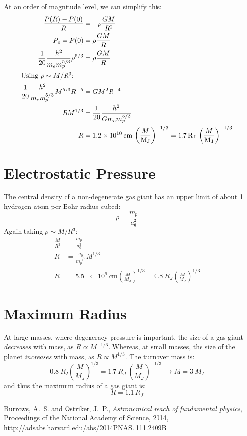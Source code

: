 \documentclass{article}
\begin{document}
    At an order of magnitude level, we can simplify this:
    \begin{align}
      \frac{P(R)-P(0)}{R} &= -\rho\frac{GM}{R^{2}}\\
      P_{e} = P(0) &= \rho\frac{GM}{R}\\
      \frac{1}{20}\frac{h^{2}}{m_{e}m_{p}^{5/3}}\rho^{5/3} &= \rho\frac{GM}{R}\\
      \intertext{Using $\rho\sim M/R^{3}$:}
      \frac{1}{20}\frac{h^{2}}{m_{e}m_{p}^{5/3}}M^{5/3}R^{-5} &= GM^{2}R^{-4}\\
      RM^{1/3} &= \frac{1}{20}\frac{h^{2}}{Gm_{e}m_{p}^{5/3}}\\
      R &= \SI{1.2e10}{\cm}\:\left(\frac{M}{\si{M_{J}}}\right)^{-1/3} = \SI{1.7}{R_{J}}\:\left(\frac{M}{\si{M_{J}}}\right)^{-1/3}
    \end{align}
  
  \section{Electrostatic Pressure}
    The central density of a non-degenerate gas giant has an upper limit of about 1 hydrogen atom per Bohr radius cubed:
    \begin{equation}
      \rho = \frac{m_{p}}{a_{0}^{3}}
    \end{equation}
    Again taking $\rho\sim M/R^{3}$:
    \begin{align}
      \frac{M}{R^{3}} &= \frac{m_{p}}{a_{0}^{3}}\\
      R &= \frac{a_{0}}{m_{p}^{1/3}}M^{1/3}\\
      R &= \SI{5.5e9}{\cm}\left(\frac{M}{\si{M_{J}}}\right)^{1/3} = \SI{0.8}{R_{J}}\left(\frac{M}{\si{M_{J}}}\right)^{1/3}
    \end{align}
    
  \section{Maximum Radius}
    At large masses, where degeneracy pressure is important, the size of a gas giant \emph{decreases} with mass, as $R\propto M^{-1/3}$.  Whereas, at small masses, the size of the planet \emph{increases} with mass, as $R\propto M^{1/3}$.  The turnover mass is:
    \begin{equation}
      \SI{0.8}{R_{J}}\left(\frac{M}{\si{M_{J}}}\right)^{1/3} = \SI{1.7}{R_{J}}\:\left(\frac{M}{\si{M_{J}}}\right)^{-1/3}\:\longrightarrow M = \SI{3}{M_{J}}
    \end{equation}
    and thus the maximum radius of a gas giant is:
    \begin{equation}
      R = \SI{1.1}{R_{J}}
    \end{equation}
    
  \begin{thebibliography}{9}
      {{Burrows}, A.~S. and {Ostriker}, J.~P.},
      \textit{Astronomical reach of fundamental physics},
      {Proceedings of the National Academy of Science},
      2014,
      {http://adsabs.harvard.edu/abs/2014PNAS..111.2409B}
    
  \end{thebibliography}
  
\end{document}
